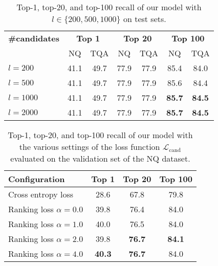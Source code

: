 \documentclass[11pt,a4paper]{article}
\begin{document}
\begin{table}[t]
  \centering
  \setlength{\tabcolsep}{5pt}
  \small{
    \begin{tabular}{l|cc|cc|cc}
      \toprule
      \textbf{\#candidates}                     & \multicolumn{2}{c|}{\textbf{Top 1}} & \multicolumn{2}{c|}{\textbf{Top 20}} & \multicolumn{2}{c}{\textbf{Top 100}} \\
                                         & NQ                                  & TQA                                  & NQ                                    & TQA                                      & NQ            & TQA \\
      \midrule
      $l=200$        & 41.1 & 49.7 & 77.9 & 77.9 & 85.4 & 84.0 \\
      $l=500$        & 41.1 & 49.7 & 77.9 & 77.9 & 85.6 & 84.4 \\
      $l=1000$       & 41.1 & 49.7 & 77.9 & 77.9 & \textbf{85.7} & \textbf{84.5} \\
      $l=2000$       & 41.1 & 49.7 & 77.9 & 77.9 & \textbf{85.7} & \textbf{84.5} \\
      \bottomrule
    \end{tabular}
    \caption{Top-1, top-20, and top-100 recall of our model with $l \in \{200, 500, 1000\}$ on test sets.}
   \label{tb:number-of-candidates}
  }
\end{table}

\begin{table}[t]
  \centering
  \small{
    \begin{tabular}{l|ccc}
      \toprule
      \textbf{Configuration}    & \textbf{Top 1} & \textbf{Top 20} & \textbf{Top 100} \\
      \midrule
      Cross entropy loss        & 28.6 & 67.8 & 79.8 \\
      \midrule
      Ranking loss $\alpha=0.0$ & 39.8 & 76.4 & 84.0 \\
      Ranking loss $\alpha=1.0$ & 40.0 & 76.5 & 84.0 \\
      Ranking loss $\alpha=2.0$ & 39.8 & \textbf{76.7} & \textbf{84.1} \\
      Ranking loss $\alpha=4.0$ & \textbf{40.3} & \textbf{76.7} & 84.0 \\
      \bottomrule
    \end{tabular}
    \caption{Top-1, top-20, and top-100 recall of our model with the various settings of the loss function $\mathcal{L}_\text{cand}$ evaluated on the validation set of the NQ dataset.}
   \label{tb:binary-loss}
  }
\end{table}
\end{document}
